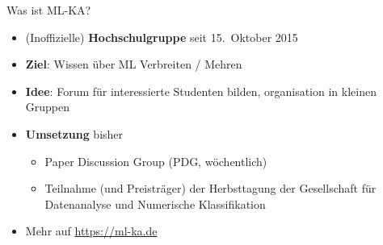 \documentclass{beamer}
\begin{document}
\begin{frame}{Was ist ML-KA?}
    \begin{itemize}
        \item (Inoffizielle) \textbf{Hochschulgruppe} seit 15.~Oktober 2015
        \item \textbf{Ziel}: Wissen über ML Verbreiten / Mehren
        \item \textbf{Idee}: Forum für interessierte Studenten bilden,
              organisation in kleinen Gruppen
        \item \textbf{Umsetzung} bisher
        \begin{itemize}
            \item Paper Discussion Group (PDG, wöchentlich)
            \item Teilnahme (und Preisträger) der Herbsttagung der Gesellschaft
                  für Datenanalyse und Numerische Klassifikation
        \end{itemize}
        \item Mehr auf \href{https://ml-ka.de/}{https://ml-ka.de}
    \end{itemize}
\end{frame}
\end{document}
